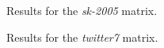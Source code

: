 \documentclass[a4paper, 11pt]{article}
\begin{document}
\begin{figure}
  \centering
  \caption{Results for the \textit{sk-2005} matrix.}
  \label{fig:sk-2005}
\end{figure}
\begin{figure}
  \centering
  \caption{Results for the \textit{twitter7} matrix.}
  \label{fig:twitter7}
\end{figure}
\end{document}
